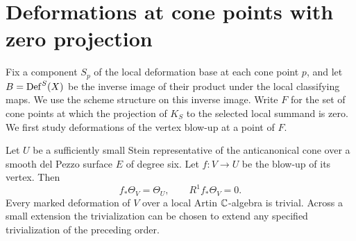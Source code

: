 \section{Deformations at cone points with zero projection}
\label{sec:rigidity}

Fix a component $S_p$ of the local deformation base at each cone point
$p$, and let $B=\operatorname{Def}^S(X)$ be the inverse image of their product under
the local classifying maps. We use the scheme structure on this inverse
image. Write $F$ for the set of cone points at which the projection of
$K_S$ to the selected local summand is zero. We first study deformations
of the vertex blow-up at a point of $F$.

\begin{lemma}\label{lem:blowup-rigidity}
Let $U$ be a sufficiently small Stein representative of the
anticanonical cone over a smooth del Pezzo surface $E$ of degree six.
Let $f:V\to U$ be the blow-up of its vertex. Then
\[
 f_*\Theta_V=\Theta_U,\qquad R^1 f_*\Theta_V=0.
\]
Every marked deformation of $V$ over a local Artin $\mathbb C$-algebra is
trivial. Across a small extension the trivialization can be chosen to
extend any specified trivialization of the preceding order.
\end{lemma}

